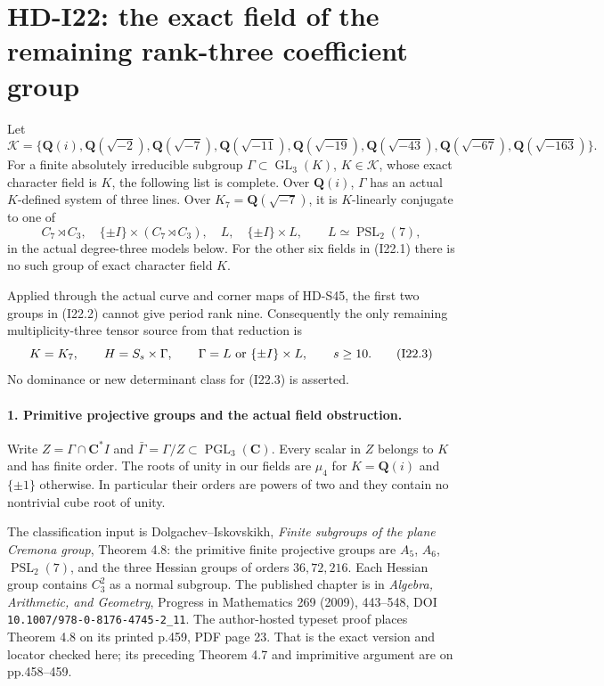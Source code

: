 \section{HD-I22: the exact field of the remaining rank-three coefficient group}
\label{sec:rank-three-exact-field}

Let
\[
 \mathcal K=\{\mathbf Q(i),\mathbf Q(\sqrt{-2}),
 \mathbf Q(\sqrt{-7}),\mathbf Q(\sqrt{-11}),
 \mathbf Q(\sqrt{-19}),\mathbf Q(\sqrt{-43}),
 \mathbf Q(\sqrt{-67}),\mathbf Q(\sqrt{-163})\}.
                                                               \tag{I22.1}
\]
For a finite absolutely irreducible subgroup
$\Gamma\subset\operatorname{GL}_3(K)$, $K\in\mathcal K$,
whose exact character field is $K$, the following list is
complete. Over $\mathbf Q(i)$, $\Gamma$ has an actual
$K$-defined system of three lines. Over
$K_7=\mathbf Q(\sqrt{-7})$, it is $K$-linearly conjugate
to one of
\[
 C_7\rtimes C_3,\quad
 \{\pm I\}\times(C_7\rtimes C_3),\quad
 L,\quad \{\pm I\}\times L,\qquad L\simeq\operatorname{PSL}_2(7),
                                                               \tag{I22.2}
\]
in the actual degree-three models below. For the other six
fields in (I22.1) there is no such group of exact character
field $K$.

Applied through the actual curve and corner maps of HD-S45,
the first two groups in (I22.2) cannot give period rank nine.
Consequently the only remaining multiplicity-three tensor
source from that reduction is
\[
 K=K_7,\qquad H=S_s\times\Gamma,\qquad
 \Gamma=L\ \hbox{or}\ \{\pm I\}\times L,
 \qquad s\ge10.                                             \tag{I22.3}
\]
No dominance or new determinant class for (I22.3) is asserted.

\paragraph{1. Primitive projective groups and the actual field obstruction.}
Write $Z=\Gamma\cap\mathbf C^*I$ and
$\bar\Gamma=\Gamma/Z\subset\operatorname{PGL}_3(\mathbf C)$.
Every scalar in $Z$ belongs to $K$ and has finite order.
The roots of unity in our fields are $\mu_4$ for $K=\mathbf Q(i)$
and $\{\pm1\}$ otherwise. In particular their orders are
powers of two and they contain no nontrivial cube root of unity.

The classification input is Dolgachev--Iskovskikh,
\emph{Finite subgroups of the plane Cremona group},
Theorem 4.8: the primitive finite projective groups are
$A_5$, $A_6$, $\operatorname{PSL}_2(7)$, and the three
Hessian groups of orders $36,72,216$. Each Hessian group
contains $C_3^2$ as a normal subgroup. The published chapter
is in \emph{Algebra, Arithmetic, and Geometry}, Progress
in Mathematics 269 (2009), 443--548,
DOI \texttt{10.1007/978-0-8176-4745-2\_11}.
The author-hosted typeset proof places Theorem 4.8 on its
printed p.459, PDF page 23. That is the exact version and
locator checked here; its preceding Theorem 4.7 and
imprimitive argument are on pp.458--459.

